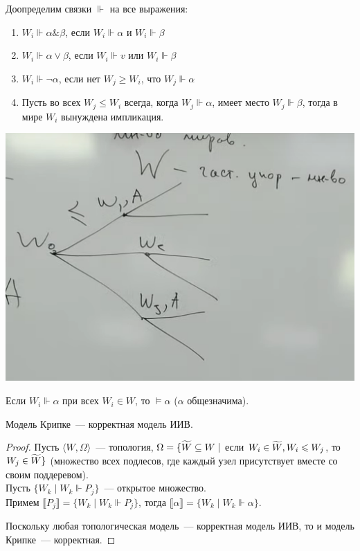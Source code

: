 \begin{definition}
Доопределим связки  $\Vdash$ на все выражения:
\begin{enumerate}
    \item $W_i \Vdash \alpha\& \beta$, если $W_i \Vdash \alpha$ и $W_i \Vdash \beta$
    \item $W_i \Vdash \alpha\lor \beta$, если $W_i \Vdash v$ или $W_i \Vdash \beta$
    \item $W_i \Vdash \neg \alpha$, если нет $W_j \geqslant W_i$, что $W_j \Vdash \alpha$
    \item Пусть во всех $W_j \leqslant W_i$ всегда, когда $W_j \Vdash \alpha$, имеет место $W_j \Vdash \beta$, тогда в мире $W_i$ вынуждена импликация.
\end{enumerate}
\end{definition}

\includegraphics[scale=0.7]{img/forced_variable_worlds}

\begin{definition}
    Если $W_i \Vdash \alpha$ при всех $W_i \in W$, то $\vDash \alpha$ ($\alpha$ общезначима).
\end{definition}


\begin{theorem}
    Модель Крипке~--- корректная модель ИИВ.
\end{theorem}
\begin{proof}
    Пусть $\langle W, \Omega\rangle$~--- топология, $\Omega = \{\widetilde{W} \subseteq W \mid$ если  $ W_i\in \widetilde{W}, W_i \leqslant W_j$, то $W_j \in \widetilde{W} \}$ (множество всех подлесов, где каждый узел присутствует вместе со своим поддеревом).\\
    Пусть $\{W_k \mid W_k \Vdash P_j\}$~--- открытое множество.\\
    Примем $\llbracket P_j \rrbracket = \{ W_k \mid W_k \Vdash P_j\}$, тогда $\llbracket \alpha \rrbracket = \{ W_k \mid W_k \Vdash \alpha\}$.

    Поскольку любая топологическая модель~--- корректная модель ИИВ, то и модель Крипке~--- корректная.
\end{proof}

